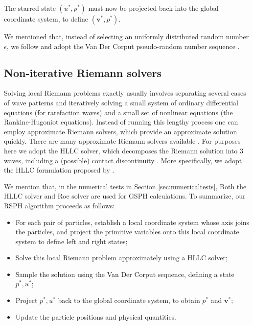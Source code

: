 \documentclass[review]{elsarticle}
\begin{document}
The starred state $(u^{\ast},  p^{\ast})$ must now be projected back into the global coordinate system, to define  $(\textbf{v}^{\ast},  p^{\ast})$.

We mentioned that, instead of selecting an uniformly distributed random number $\epsilon$, we follow \citet{colella1982glimm} and adopt the Van Der Corput pseudo-random number sequence \citep{hammersley2013monte}.

\subsection{Non-iterative Riemann solvers} \label{sec:RP-solver}
Solving local Riemann problems exactly usually involves separating several cases of wave patterns and iteratively solving a small system of ordinary differential equations (for rarefaction waves) and a small set of nonlinear equations (the Rankine-Hugoniot equations). Instead of running this lengthy process one can employ approximate Riemann solvers, which provide an approximate solution quickly. There are many approximate Riemann solvers available \citep{rider1994review, luo2004computation, puri2014approximate}. For purposes here we adopt the HLLC solver, which decomposes the Riemann solution into 3 waves, including a (possible) contact discontinuity \cite{toro1994restoration}. More specifically, we adopt the HLLC formulation proposed by \citet{luo2004computation}.
 
We mention that, in the numerical tests in Section \ref{sec:numericaltests}, Both the HLLC solver and Roe solver are used for GSPH calculations.
To summarize, our RSPH algorithm proceeds as follows:
\begin{itemize}
\item For each pair of particles, establish a local coordinate system whose axis joins the particles,
and project the primitive variables onto this local coordinate system to define left and right states;
\item Solve this local Riemann problem approximately using a HLLC solver;
\item Sample the solution using the Van Der Corput sequence, defining a state  $p^{\ast}, u^{\ast}$;
\item Project $p^{\ast}, u^{\ast}$  back to the global coordinate system, to obtain $p^{\ast}$ and $\textbf{v}^{\ast}$;
\item Update the particle positions and physical quantities.
\end{itemize}
\end{document}
